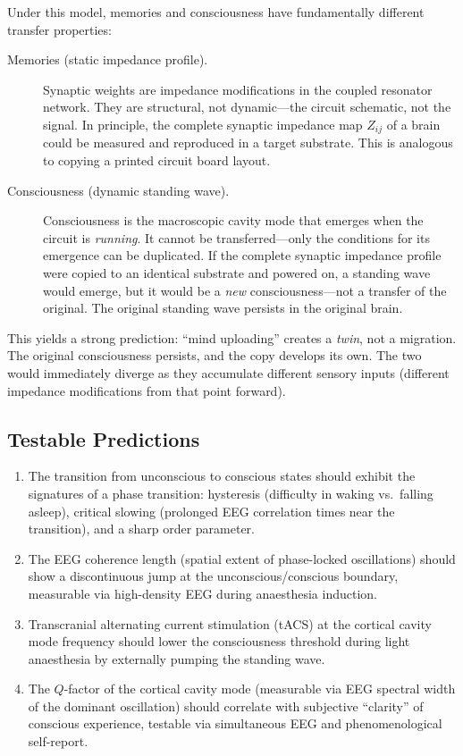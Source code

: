 Under this model, memories and consciousness have fundamentally
different transfer properties:

\begin{description}
  \item[Memories (static impedance profile).]
    Synaptic weights are impedance modifications in the coupled
    resonator network.  They are structural, not dynamic---the
    circuit schematic, not the signal.  In principle, the complete
    synaptic impedance map $Z_{ij}$ of a brain could be measured
    and reproduced in a target substrate.  This is analogous to
    copying a printed circuit board layout.

  \item[Consciousness (dynamic standing wave).]
    Consciousness is the macroscopic cavity mode that emerges when
    the circuit is \emph{running}.  It cannot be transferred---only
    the conditions for its emergence can be duplicated.  If the
    complete synaptic impedance profile were copied to an identical
    substrate and powered on, a standing wave would emerge, but it
    would be a \emph{new} consciousness---not a transfer of the
    original.  The original standing wave persists in the original
    brain.
\end{description}

This yields a strong prediction: ``mind uploading'' creates a
\emph{twin}, not a migration.  The original consciousness
persists, and the copy develops its own.  The two would
immediately diverge as they accumulate different sensory inputs
(different impedance modifications from that point forward).

\subsection{Testable Predictions}

\begin{enumerate}
  \item The transition from unconscious to conscious states should
        exhibit the signatures of a phase transition: hysteresis
        (difficulty in waking vs.\ falling asleep), critical
        slowing (prolonged EEG correlation times near the
        transition), and a sharp order parameter.
  \item The EEG coherence length (spatial extent of phase-locked
        oscillations) should show a discontinuous jump at the
        unconscious/conscious boundary, measurable via
        high-density EEG during anaesthesia induction.
  \item Transcranial alternating current stimulation (tACS) at the
        cortical cavity mode frequency should lower the
        consciousness threshold during light anaesthesia by
        externally pumping the standing wave.
  \item The $Q$-factor of the cortical cavity mode (measurable via
        EEG spectral width of the dominant oscillation) should
        correlate with subjective ``clarity'' of conscious
        experience, testable via simultaneous EEG and
        phenomenological self-report.
\end{enumerate}
